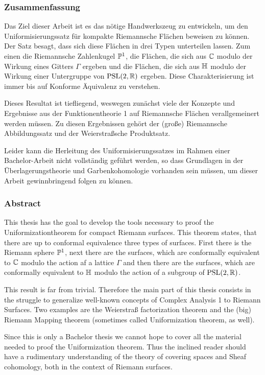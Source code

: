 
\subsubsection*{Zusammenfassung}
\label{sec:Zusammenfassung}

Das Ziel dieser Arbeit ist es das nötige Handwerkszeug zu
entwickeln, um den Uniformisierungssatz für kompakte Riemannsche
Flächen beweisen zu können. Der Satz besagt, dass sich diese
Flächen in drei Typen unterteilen lassen. Zum einen die Riemannsche
Zahlenkugel $\P^1$, die Flächen, die sich aus $\C$ modulo der
Wirkung eines Gitters $\Gamma$ ergeben und die Flächen, die sich aus
$\h$ modulo der Wirkung einer Untergruppe von $\PSL(2, \R)$
ergeben. Diese Charakterisierung ist immer bis auf Konforme
Äquivalenz zu verstehen.

Dieses Resultat ist tiefliegend, weswegen zunächst viele der
Konzepte und Ergebnisse aus der Funktionentheorie 1 auf
Riemannsche Flächen verallgemeinert werden müssen. Zu diesen
Ergebnissen gehört der (große) Riemannsche Abbildungssatz und der
Weierstraßsche Produktsatz.

Leider kann die Herleitung des Uniformisierungssatzes im Rahmen
einer Bachelor-Arbeit nicht vollständig geführt werden, so dass
Grundlagen in der Überlagerungstheorie und Garbenkohomologie
vorhanden sein müssen, um dieser Arbeit gewinnbringend folgen zu können.

\subsubsection*{Abstract}
\label{sec:abstract}

This thesis has the goal to develop the tools necessary to proof the
Uniformizationtheorem for compact Riemann surfaces. This theorem
states, that there are up to conformal equivalence three types of
surfaces. First there is the Riemann sphere $\P^1$, next there are the
surfaces, which are conformally equivalent to $\C$ modulo the action
af a lattice $\Gamma$ and then there are the surfaces, which are
conformally equivalent to $\h$ modulo the action of a subgroup of
$\PSL(2, \R)$.

This result is far from trivial. Therefore the main part of this
thesis consists in the struggle to generalize well-known concepts of
Complex Analysis 1 to Riemann Surfaces. Two examples are the
Weierstraß factorization theorem and the (big) Riemann Mapping theorem
(sometimes called Uniformization theorem, as well).

Since this is only a Bachelor thesis we cannot hope to cover all the
material needed to proof the Uniformization theorem. Thus the inclined
reader should have a rudimentary understanding of the theory of
covering spaces and Sheaf cohomology, both in the context of Riemann surfaces.

